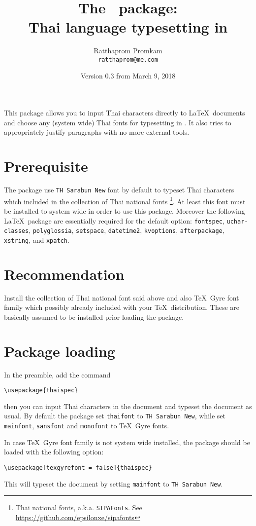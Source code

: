 \documentclass{article}
\title{The \pkgname\ package: \\Thai language typesetting in \XeLaTeX}
\author{Ratthaprom Promkam\\{\texttt{\small ratthaprom@me.com}}}
\date{Version 0.3 from March 9, 2018}
\begin{document}
\maketitle

This package allows you to input Thai characters directly to \LaTeX\ documents
and choose any (system wide) Thai fonts for typesetting in \XeLaTeX.
It also tries to appropriately justify paragraphs with no more external tools.

\tableofcontents


\section{Prerequisite}
The package use \texttt{TH Sarabun New} font by default to typeset Thai characters
which included in the collection of Thai national fonts
\footnote{Thai national fonts, a.k.a. \texttt{SIPAFonts}.
See \url{https://github.com/epsilonxe/sipafonts}}.
At least this font must be installed to system wide in order to use this package.
Moreover the following \LaTeX\ package are essentially required for the default option: \texttt{fontspec}, \texttt{uchar­classes}, \texttt{poly­glos­sia}, \texttt{setspace}, \texttt{date­time2}, \texttt{kvop­tions}, \texttt{after­pack­age}, \texttt{xstring}, and \texttt{xpatch}.

\section{Recommendation}
Install the collection of Thai national font said above and also \TeX\ Gyre font family
which possibly already included with your \TeX\ distribution.
These are basically assumed to be installed prior loading the package.

\section{Package loading}
In the preamble, add the command
\begin{verbatim}
\usepackage{thaispec}
\end{verbatim}
then you can input Thai characters in the document and typeset the document as usual.
By default the package set \texttt{thaifont} to \texttt{TH Sarabun New},
while set \texttt{mainfont}, \texttt{sansfont} and \texttt{monofont} to \TeX\ Gyre fonts.

In case \TeX\ Gyre font family is not system wide installed, the package should be loaded
with the following option:
\begin{verbatim}
\usepackage[texgyrefont = false]{thaispec}
\end{verbatim}
This will typeset the document by setting \texttt{mainfont} to \texttt{TH Sarabun New}.
\end{document}
